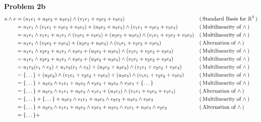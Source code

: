 \documentclass[fleqn]{article}
\newcommand{\problem}[1]{\large\textbf{Problem #1}\normalsize}
\newcommand{\evidence}[1]{\ensuremath{(\hspace{0.2em} \text{#1} \hspace{0.2em})}}
\begin{document}
\problem{2b}
\begin{align*}
  u \wedge v
     &= (u_1 e_1 + u_2 e_2 + u_3 e_3) \wedge (v_1 e_1 + v_2 e_2 + v_3 e_3)
     && \evidence{Standard Basis for $\mathbb{R}^3$} \\
  {} &= u_1 e_1 \wedge (v_1 e_1 + v_2 e_2 + v_3 e_3) +
        (u_2 e_2 + u_3 e_3) \wedge (v_1 e_1 + v_2 e_2 + v_3 e_3)
     && \evidence{Multilinearity of $\wedge$} \\
  {} &= u_1 e_1 \wedge v_1 e_1 + u_1 e_1 \wedge (v_2 e_2 + v_3 e_3) +
        (u_2 e_2 + u_3 e_3) \wedge (v_1 e_1 + v_2 e_2 + v_3 e_3)
     && \evidence{Multilinearity of $\wedge$} \\
  {} &= u_1 e_1 \wedge (v_2 e_2 + v_3 e_3) +
        (u_2 e_2 + u_3 e_3) \wedge (v_1 e_1 + v_2 e_2 + v_3 e_3)
     && \evidence{Alternation of $\wedge$} \\
  {} &= u_1 e_1 \wedge v_2 e_2 + u_1 e_1 \wedge v_3 e_3 +
        (u_2 e_2 + u_3 e_3) \wedge (v_1 e_1 + v_2 e_2 + v_3 e_3)
     && \evidence{Multilinearity of $\wedge$} \\
  {} &= u_1 e_1 \wedge v_2 e_2 + u_1 e_1 \wedge v_3 e_3 +
        (u_2 e_2 + u_3 e_3) \wedge (v_1 e_1 + v_2 e_2 + v_3 e_3)
     && \evidence{Multilinearity of $\wedge$} \\
  {} &= u_1v_2(e_1 \wedge e_2) + u_1v_3(e_1 \wedge e_3) +
        (u_2 e_2 + u_3 e_3) \wedge (v_1 e_1 + v_2 e_2 + v_3 e_3)
     && \evidence{Multilinearity of $\wedge$} \\
  {} &= \{ \dots \} + 
       (u_2 e_2) \wedge (v_1 e_1 + v_2 e_2 + v_3 e_3) +
       (u_3 e_3) \wedge (v_1 e_1 + v_2 e_2 + v_3 e_3)
     && \evidence{Multilinearity of $\wedge$} \\
  {} &= \{ \dots \} + 
       u_2 e_2 \wedge v_1 e_1 + u_2 e_2 \wedge v_2 e_2 + u_2 e_2 \wedge v_3 e_3 +
       \{ \dots \}
     && \evidence{Multilinearity of $\wedge$} \\
  {} &= \{ \dots \} + 
       u_2 e_2 \wedge v_1 e_1 + u_2 e_2 \wedge v_3 e_3 +
       (u_3 e_3) \wedge (v_1 e_1 + v_2 e_2 + v_3 e_3)
     && \evidence{Alternation of $\wedge$} \\
  {} &= \{ \dots \} + \{ \dots \} +
       u_3 e_3 \wedge v_1 e_1 + u_3 e_3 \wedge v_2 e_2 + u_3 e_3 \wedge v_3 e_3
     && \evidence{Multilinearity of $\wedge$} \\
  {} &= \{ \dots \} +
       u_2 e_2 \wedge v_1 e_1 + u_2 e_2 \wedge v_3 e_3 +
       u_3 e_3 \wedge v_1 e_1 + u_3 e_3 \wedge v_2 e_2
     && \evidence{Alternation of $\wedge$} \\
  {} &= \{ \dots \} +

\end{align*}
\end{document}
